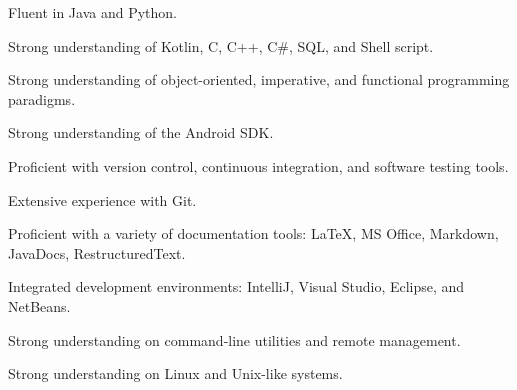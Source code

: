 
\begin{cvskills}
    {
      \begin{cvitems}
        \item {Fluent in Java and Python.}
        \item {Strong understanding of Kotlin, C, C++, C\#, SQL, and Shell script.}
        \item {Strong understanding of object-oriented, imperative, and functional programming paradigms.}
        \item {Strong understanding of the Android SDK.}
      \end{cvitems}
    }

  {
    \begin{cvitems}
      \item {Proficient with version control, continuous integration, and software testing tools.}
      \item {Extensive experience with Git.}
      \item {Proficient with a variety of documentation tools: \LaTeX, MS Office, Markdown, JavaDocs, RestructuredText.}
    \end{cvitems}
  }

    {
      \begin{cvitems}
        \item {Integrated development environments: IntelliJ, Visual Studio, Eclipse, and NetBeans.}
        \item {Strong understanding on command-line utilities and remote management.}
        \item {Strong understanding on Linux and Unix-like systems.}
      \end{cvitems}
    }

\end{cvskills}
